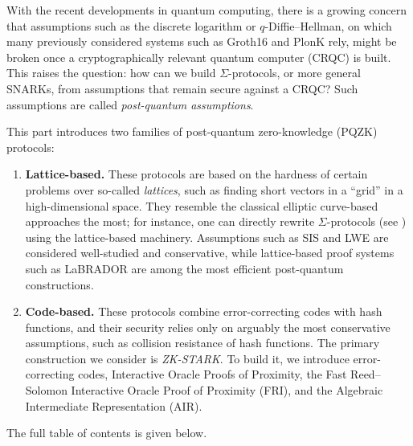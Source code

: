 \documentclass[../../../book]{subfiles}
\begin{document}
With the recent developments in quantum computing, there is a growing concern that assumptions such as the discrete logarithm or $q$-Diffie--Hellman, on which many previously considered systems such as Groth16 and PlonK rely, might be broken once a cryptographically relevant quantum computer (CRQC) is built.
This raises the question: how can we build $\Sigma$-protocols, or more general SNARKs, from assumptions that remain secure against a CRQC?
Such assumptions are called \emph{post-quantum assumptions}.

This part introduces two families of post-quantum zero-knowledge (PQZK) protocols:
\begin{enumerate}
    \item \textbf{Lattice-based.} These protocols are based on the hardness of certain problems over so-called \emph{lattices}, such as finding short vectors in a ``grid'' in a high-dimensional space.
    They resemble the classical elliptic curve-based approaches the most; for instance, one can directly rewrite $\Sigma$-protocols (see ) using the lattice-based machinery.
    Assumptions such as SIS and LWE are considered well-studied and conservative, while lattice-based proof systems such as LaBRADOR are among the most efficient post-quantum constructions.
    \item \textbf{Code-based.} These protocols combine error-correcting codes with hash functions, and their security relies only on arguably the most conservative assumptions, such as collision resistance of hash functions.
    The primary construction we consider is \emph{ZK-STARK}.
    To build it, we introduce error-correcting codes, Interactive Oracle Proofs of Proximity, the Fast Reed--Solomon Interactive Oracle Proof of Proximity (FRI), and the Algebraic Intermediate Representation (AIR).
\end{enumerate}

The full table of contents is given below.
\end{document}
